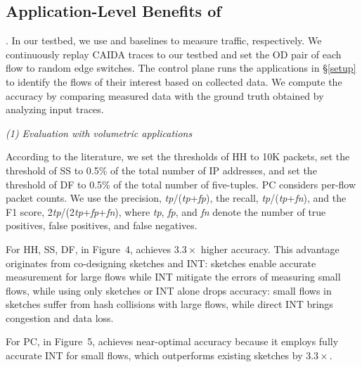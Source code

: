 \subsection{Application-Level Benefits of \sysname}

. 
In our testbed, we use \sysname and baselines to measure traffic, respectively. We continuously replay CAIDA traces \cite{caida} to our testbed and set the OD pair of each flow to random edge switches. The control plane runs the applications in \S\ref{setup} to identify the flows of their interest based on collected data. We compute the accuracy by comparing measured data with the ground truth obtained by analyzing input traces. 


\noindent \emph{(1) Evaluation with volumetric applications}

According to the literature, we set the thresholds of HH to 10K packets, set the threshold of SS to 0.5\% of the total number of IP addresses, and set the threshold of DF to 0.5\% of the total number of five-tuples. PC considers per-flow packet counts. We use the precision, \emph{tp}/(\emph{tp}+\emph{fp}), the recall, \emph{tp}/(\emph{tp}+\emph{fn}), and the F1 score, 2\emph{tp}/(2\emph{tp}+\emph{fp}+\emph{fn}), where \emph{tp}, \emph{fp}, and \emph{fn} denote the number of true positives, false positives, and false negatives. 


For HH, SS, DF, in Figure~4, \sysname achieves $3.3\times$ higher accuracy. This advantage originates from co-designing sketches and INT: sketches enable accurate measurement for large flows while INT mitigate the errors of measuring small flows, while using only sketches or INT alone drops accuracy: small flows in sketches suffer from hash collisions with large flows, while direct INT brings congestion and data loss. 

For PC, in Figure~5, \sysname achieves near-optimal accuracy because it employs fully accurate INT for small flows, which outperforms existing sketches by $3.3\times$.  


